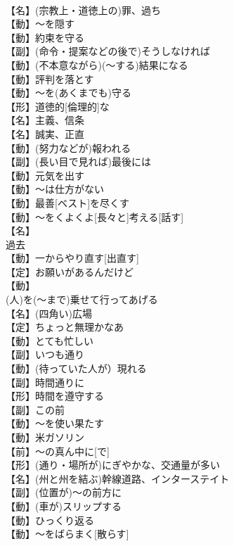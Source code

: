 \documentclass[8pt]{extreport}
\begin{document}
\begin{CJK}{UTF8}{min}
\\	【名】(宗教上・道徳上の)罪、過ち
\\	【動】～を隠す
\\	【動】約束を守る
\\	【副】(命令・提案などの後で)そうしなければ
\\	【動】(不本意ながら)(～する)結果になる
\\	【動】評判を落とす
\\	【動】～を(あくまでも)守る
\\	【形】道徳的[倫理的]な
\\	【名】主義、信条
\\	【名】誠実、正直
\\	【動】(努力などが)報われる
\\	【副】(長い目で見れば)最後には
\\	【動】元気を出す
\\	【動】～は仕方がない
\\	【動】最善[ベスト]を尽くす
\\	【動】～をくよくよ[長々と]考える[話す]
\\	【名】
\\	過去
\\	【動】一からやり直す[出直す]
\\	【定】お願いがあるんだけど
\\	【動】
\\	(人)を(～まで)乗せて行ってあげる
\\	【名】(四角い)広場
\\	【定】ちょっと無理かなあ
\\	【動】とても忙しい
\\	【副】いつも通り
\\	【動】(待っていた人が）現れる
\\	【副】時間通りに
\\	【形】時間を遵守する
\\	【副】この前
\\	【動】～を使い果たす
\\	【動】{米}ガソリン
\\	【前】～の真ん中に[で]
\\	【形】(通り・場所が)にぎやかな、交通量が多い
\\	【名】(州と州を結ぶ)幹線道路、インターステイト
\\	【副】(位置が)～の前方に
\\	【動】(車が)スリップする
\\	【動】ひっくり返る
\\	【動】～をばらまく[散らす]

\end{CJK}
\end{document}
